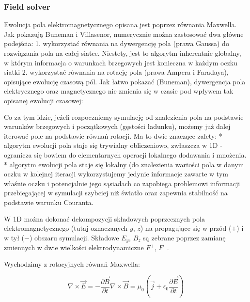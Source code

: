     \subsubsection{Field solver} 

    Ewolucja pola elektromagnetycznego opisana jest poprzez równania Maxwella. Jak pokazują Buneman i Villasenor,
    numerycznie można zastosować dwa główne podejścia: 
    1. wykorzystać równania na dywergencję pola (prawa Gaussa) do rozwiązania pola na całej siatce. Niestety, jest to
    algorytm inherentnie globalny, w którym informacja o warunkach brzegowych jest konieczna w każdym oczku siatki
    2. wykorzystać równania na rotację pola (prawa Ampera i Faradaya), opisujące ewolucję czasową pól. Jak łatwo pokazać (Buneman),
    dywergencja pola elektrycznego oraz magnetycznego nie zmienia się w czasie pod wpływem tak opisanej ewolucji czasowej:

    Co za tym idzie, jeżeli rozpoczniemy symulację od znalezienia pola na podstawie warunków brzegowych i początkowych (gęstości
    ładunku), możemy już dalej iterować pole na podstawie równań rotacji. Ma to dwie znaczące zalety:
    * algorytm ewolucji pola staje się trywialny obliczeniowo, zwłaszcza w 1D -
        ogranicza się bowiem do elementarnych operacji lokalnego dodawania i mnożenia.
    * algorytm ewolucji pola staje się lokalny (do znalezienia wartości pola w danym oczku w kolejnej iteracji wykorzystujemy
    jedynie informacje zawarte w tym właśnie oczku i potencjalnie jego sąsiadach 
    co zapobiega problemowi informacji przebiegającej w symulacji szybciej niż światło oraz zapewnia stabilność na podstawie
    warunku Couranta.

    W 1D można dokonać dekompozycji składowych poprzecznych pola elektromagnetycznego (tutaj oznaczanych $y$, $z$) na
    propagujące się w przód ($+$) i w tył ($-$) obszaru symulacji. Składowe $E_y$, $B_z$ są zebrane poprzez zamianę zmiennych
    w dwie wielkości elektrodynamiczne $F^+$, $F^-$.

    Wychodzimy z rotacyjnych równań Maxwella:

    \begin{equation}
        \nabla \times \vec{E} = -\frac{\partial \vec{B}}{\partial t}
        \nabla \times \vec{B} = \mu_0 (\vec{j} + \epsilon_0 \frac{\partial \vec{E}}{\partial t})
        \label{eqn:Maxwell-rotation-derivation}
    \end{equation}

